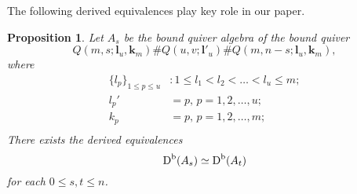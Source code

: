 \documentclass[a4paper, reqno]{amsart}
\newtheorem{prop}[thm]{Proposition}
\theoremstyle{definition}
\theoremstyle{remark}
\numberwithin{equation}{section}
\begin{document}
The following derived equivalences play key role in our paper.

\begin{prop}\label{Dl=Dr}
Let $A_s$ be the bound quiver algebra of the bound quiver 
$$Q(m,s;{\mathbf{l}}_u,{\mathbf{k}}_{m})\#Q(u,v;{\mathbf{l}}'_{u})\#Q(m,n-s;{\mathbf{l}}_u,{\mathbf{k}}_{m}),$$
where 
\begin{align*}
    \{l_p\}_{1\leq p \leq u} &: 1\leq l_1< l_2 < \dots < l_u \leq m;\\
    l_p' &= p,\, p= 1,2,\dots,u;\\
    k_p  &= p,\, p= 1,2,\dots,m;\\
\end{align*}
    There exists the derived equivalences
    $$\textup{D}^{\textup{b}}(A_s) \simeq \textup{D}^{\textup{b}}(A_t)$$
for each $0\leq s,t\leq n$.
\end{prop}
\end{document}
